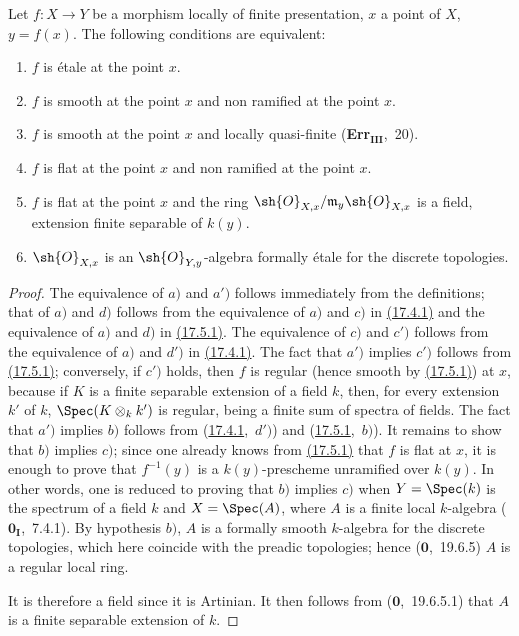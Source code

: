 \begin{theorem}[17.6.1]
\label{IV.17.6.1}
Let $f:X\to Y$ be a morphism locally of finite presentation, $x$ a point of $X$, $y=f(x)$.
The following conditions are equivalent:
\begin{enumerate}[label=(\alph*)]
  \item[a)] $f$ is \'etale at the point $x$.
  \item[a')] $f$ is smooth at the point $x$ and non ramified at the point $x$.
  \item[b)] $f$ is smooth at the point $x$ and locally quasi-finite (\textbf{Err}$_\textbf{III}$,~20).
  \item[c)] $f$ is flat at the point $x$ and non ramified at the point $x$.
  \item[c')] $f$ is flat at the point $x$ and the ring $\sh{O}_{X,x}/\mathfrak{m}_y\sh{O}_{X,x}$ is a field, extension finite separable of $k(y)$.
  \item[d)] $\sh{O}_{X,x}$ is an $\sh{O}_{Y,y}$-algebra formally \'etale for the discrete topologies.
\end{enumerate}
\end{theorem}

\begin{proof}
The equivalence of $a)$ and $a')$ follows immediately from the definitions; that of $a)$ and $d)$ follows from the equivalence of $a)$ and $c)$ in {\hyperlink{ega4.c04.thm.17-4-1}{(17.4.1)}} and the equivalence of $a)$ and $d)$ in {\hyperlink{ega4.c04.thm.17-5-1}{(17.5.1)}}.
The equivalence of $c)$ and $c')$ follows from the equivalence of $a)$ and $d')$ in {\hyperlink{ega4.c04.thm.17-4-1}{(17.4.1)}}.
The fact that $a')$ implies $c')$ follows from {\hyperlink{ega4.c04.thm.17-5-1}{(17.5.1)}}; conversely, if $c')$ holds, then $f$ is regular (hence smooth by {\hyperlink{ega4.c04.thm.17-5-1}{(17.5.1)}}) at $x$, because if $K$ is a finite separable extension of a field $k$, then, for every extension $k'$ of $k$, $\Spec(K\otimes_k k')$ is regular, being a finite sum of spectra of fields.
The fact that $a')$ implies $b)$ follows from ({\hyperlink{ega4.c04.thm.17-4-1}{17.4.1}},~$d')$) and ({\hyperlink{ega4.c04.thm.17-5-1}{17.5.1}},~$b)$).
It remains to show that $b)$ implies $c)$; since one already knows from {\hyperlink{ega4.c04.thm.17-5-1}{(17.5.1)}} that $f$ is flat at $x$, it is enough to prove that $f^{-1}(y)$ is a $k(y)$-prescheme unramified over $k(y)$.
In other words, one is reduced to proving that $b)$ implies $c)$ when $Y=\Spec(k)$ is the spectrum of a field $k$ and $X=\Spec(A)$, where $A$ is a finite local $k$-algebra ($\mathbf{0}_\mathbf{I}$,~7.4.1).
By hypothesis $b)$, $A$ is a formally smooth $k$-algebra for the discrete topologies, which here coincide with the preadic topologies; hence ($\mathbf{0}$,~19.6.5) $A$ is a regular local ring.


It is therefore a field since it is Artinian.
It then follows from ($\mathbf{0}$,~19.6.5.1) that $A$ is a finite separable extension of $k$.
\end{proof}

